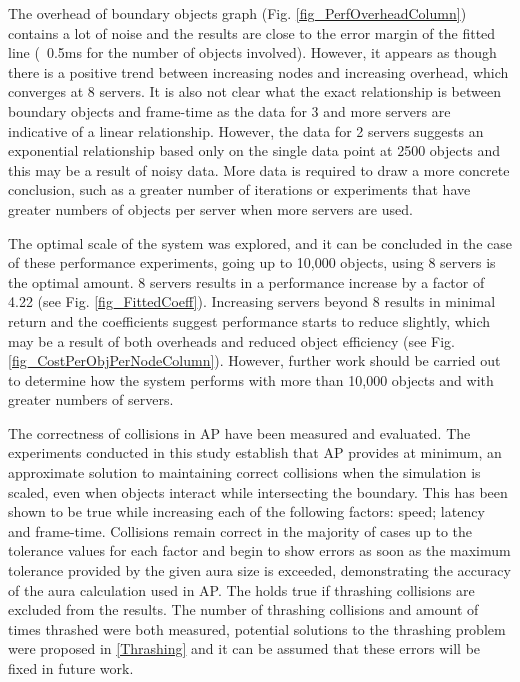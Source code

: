 The overhead of boundary objects graph (Fig. \ref{fig_PerfOverheadColumn}) contains a lot of noise and the results are close to the error margin of the fitted line (~0.5ms for the number of objects involved). However, it appears as though there is a positive trend between increasing nodes and increasing overhead, which converges at 8 servers. It is also not clear what the exact relationship is between boundary objects and frame-time as the data for 3 and more servers are indicative of a linear relationship. However, the data for 2 servers suggests an exponential relationship based only on the single data point at 2500 objects and this may be a result of noisy data. More data is required to draw a more concrete conclusion, such as a greater number of iterations or experiments that have greater numbers of objects per server when more servers are used.

The optimal scale of the system was explored, and it can be concluded in the case of these performance experiments, going up to 10,000 objects, using 8 servers is the optimal amount. 8 servers results in a performance increase by a factor of 4.22 (see Fig. \ref{fig_FittedCoeff}). Increasing servers beyond 8 results in minimal return and the coefficients suggest performance starts to reduce slightly, which may be a result of both overheads and reduced object efficiency (see Fig. \ref{fig_CostPerObjPerNodeColumn}). However, further work should be carried out to determine how the system performs with more than 10,000 objects and with greater numbers of servers.

The correctness of collisions in AP have been measured and evaluated. The experiments conducted in this study establish that AP provides at minimum, an approximate solution to maintaining correct collisions when the simulation is scaled, even when objects interact while intersecting the boundary. This has been shown to be true while increasing each of the following factors: speed; latency and frame-time. Collisions remain correct in the majority of cases up to the tolerance values for each factor and begin to show errors as soon as the maximum tolerance provided by the given aura size is exceeded, demonstrating the accuracy of the aura calculation used in AP. The holds true if thrashing collisions are excluded from the results. The number of thrashing collisions and amount of times thrashed were both measured, potential solutions to the thrashing problem were proposed in \ref{Thrashing} and it can be assumed that these errors will be fixed in future work.

